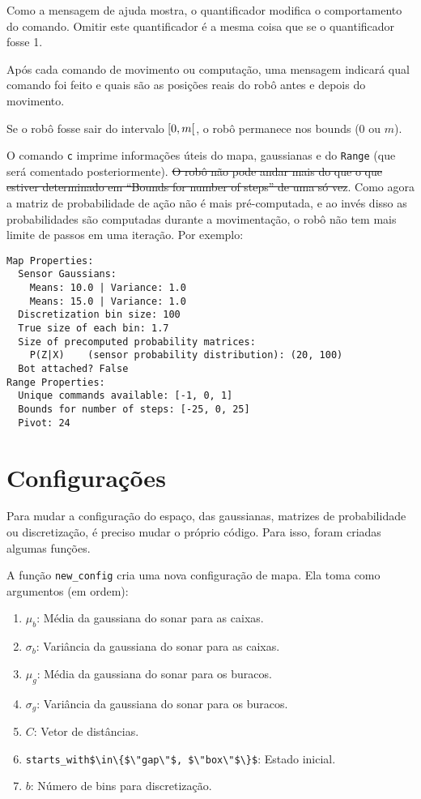 \documentclass[12pt]{article}
\theoremstyle{plain}
\numberwithin{equation}{section}
\newcommand{\code}[1]{\lstinline[mathescape=true]{#1}}
\newcommand{\mcode}[1]{\lstinline[mathescape]!#1!}
\begin{document}
Como a mensagem de ajuda mostra, o quantificador modifica o comportamento do comando. Omitir este
quantificador é a mesma coisa que se o quantificador fosse 1.

Após cada comando de movimento ou computação, uma mensagem indicará qual comando foi feito e quais
são as posições reais do robô antes e depois do movimento.

Se o robô fosse sair do intervalo $\interval[open right]{0}{m}$, o robô permanece nos bounds (0 ou
$m$).

O comando \code{c} imprime informações úteis do mapa, gaussianas e do \code{Range} (que será
comentado posteriormente). \sout{O robô não pode andar mais do que o que estiver determinado em ``Bounds
for number of steps'' de uma só vez}. Como agora a matriz de probabilidade de ação não é mais
pré-computada, e ao invés disso as probabilidades são computadas durante a movimentação, o robô não
tem mais limite de passos em uma iteração. Por exemplo:\\

\begin{lstlisting}
Map Properties:
  Sensor Gaussians:
    Means: 10.0 | Variance: 1.0
    Means: 15.0 | Variance: 1.0
  Discretization bin size: 100
  True size of each bin: 1.7
  Size of precomputed probability matrices:
    P(Z|X)    (sensor probability distribution): (20, 100)
  Bot attached? False
Range Properties:
  Unique commands available: [-1, 0, 1]
  Bounds for number of steps: [-25, 0, 25]
  Pivot: 24
\end{lstlisting}

\section{Configurações}

Para mudar a configuração do espaço, das gaussianas, matrizes de probabilidade ou discretização, é
preciso mudar o próprio código. Para isso, foram criadas algumas funções.

A função \code{new_config} cria uma nova configuração de mapa. Ela toma como argumentos (em ordem):

\begin{enumerate}
  \item $\mu_b$: Média da gaussiana do sonar para as caixas.
  \item $\sigma_b$: Variância da gaussiana do sonar para as caixas.
  \item $\mu_g$: Média da gaussiana do sonar para os buracos.
  \item $\sigma_g$: Variância da gaussiana do sonar para os buracos.
  \item $C$: Vetor de distâncias.
  \item \mcode{starts_with$\in\{$\"gap\"$, $\"box\"$\}$}: Estado inicial.
  \item $b$: Número de bins para discretização.
\end{enumerate}
\end{document}
